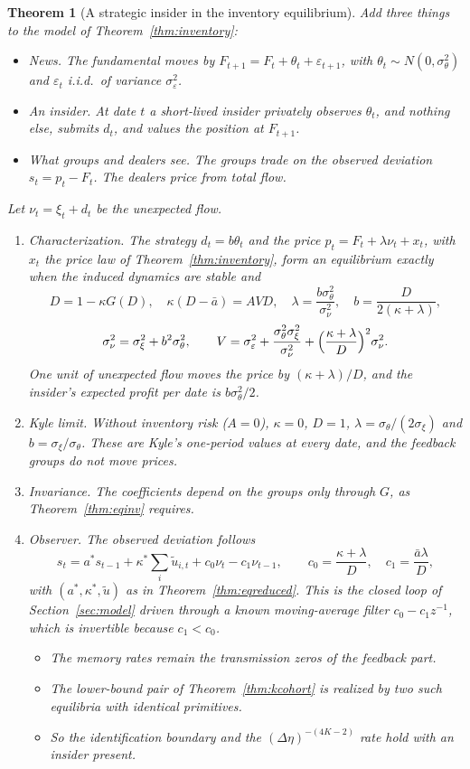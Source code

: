 \documentclass[12pt]{article}
\newtheorem{theorem}{Theorem}[section]
\theoremstyle{definition}
\theoremstyle{remark}
\begin{document}
\begin{theorem}[A strategic insider in the inventory equilibrium]\label{thm:insider}
Add three things to the model of Theorem~\ref{thm:inventory}:
\begin{itemize}[itemsep=1pt,topsep=2pt]
\item \emph{News.} The fundamental moves by $F_{t+1}=F_t+\theta_t+\varepsilon_{t+1}$, with $\theta_t\sim N(0,\sigma_\theta^2)$ and $\varepsilon_t$ i.i.d.\ of variance $\sigma_\varepsilon^2$.
\item \emph{An insider.} At date $t$ a short-lived insider privately observes $\theta_t$, and nothing else, submits $d_t$, and values the position at $F_{t+1}$.
\item \emph{What groups and dealers see.} The groups trade on the observed deviation $s_t=p_t-F_t$. The dealers price from total flow.
\end{itemize}
Let $\nu_t=\xi_t+d_t$ be the unexpected flow.
\begin{enumerate}[label=(\roman*),itemsep=1pt]
\item \emph{Characterization.} The strategy $d_t=b\theta_t$ and the price $p_t=F_t+\lambda\nu_t+x_t$, with $x_t$ the price law of Theorem~\ref{thm:inventory}, form an equilibrium exactly when the induced dynamics are stable and
\[
 D=1-\kappa G(D),\quad \kappa(D-\bar a)=AVD,\quad \lambda=\frac{b\sigma_\theta^2}{\sigma_\nu^2},\quad b=\frac{D}{2(\kappa+\lambda)},
\]
\[
 \sigma_\nu^2=\sigma_\xi^2+b^2\sigma_\theta^2,\qquad V=\sigma_\varepsilon^2+\frac{\sigma_\theta^2\sigma_\xi^2}{\sigma_\nu^2}+\Bigl(\frac{\kappa+\lambda}{D}\Bigr)^2\sigma_\nu^2 .
\]
One unit of unexpected flow moves the price by $(\kappa+\lambda)/D$, and the insider's expected profit per date is $b\sigma_\theta^2/2$.
\item \emph{Kyle limit.} Without inventory risk ($A=0$), $\kappa=0$, $D=1$, $\lambda=\sigma_\theta/(2\sigma_\xi)$ and $b=\sigma_\xi/\sigma_\theta$. These are Kyle's one-period values at every date, and the feedback groups do not move prices.
\item \emph{Invariance.} The coefficients depend on the groups only through $G$, as Theorem~\ref{thm:eqinv} requires.
\item \emph{Observer.} The observed deviation follows
\[
 s_t=a^*s_{t-1}+\kappa^*\sum_i\tilde u_{i,t}+c_0\nu_t-c_1\nu_{t-1},\qquad c_0=\frac{\kappa+\lambda}{D},\quad c_1=\frac{\bar a\lambda}{D},
\]
with $(a^*,\kappa^*,\tilde u)$ as in Theorem~\ref{thm:eqreduced}. This is the closed loop of Section~\ref{sec:model} driven through a known moving-average filter $c_0-c_1z^{-1}$, which is invertible because $c_1<c_0$.
\begin{itemize}[itemsep=1pt,topsep=2pt]
\item The memory rates remain the transmission zeros of the feedback part.
\item The lower-bound pair of Theorem~\ref{thm:kcohort} is realized by two such equilibria with identical primitives.
\item So the identification boundary and the $(\Delta\eta)^{-(4K-2)}$ rate hold with an insider present.
\end{itemize}
\end{enumerate}
\end{theorem}
\end{document}
